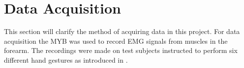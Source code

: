 \section{Data Acquisition} \label{sec:M:dataAcquisition}

This section will clarify the method of acquiring data in this project. For data acquisition the MYB was used to record EMG signals from muscles in the forearm. The recordings were made on test subjects instructed to perform six different hand gestures as introduced in . 



